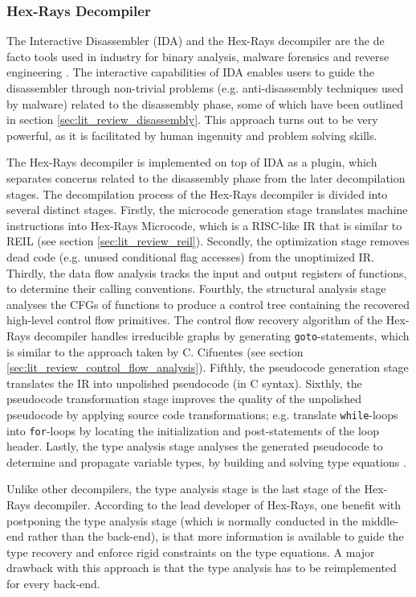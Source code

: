 
\subsubsection{Hex-Rays Decompiler}

The Interactive Disassembler (IDA) and the Hex-Rays decompiler are the de facto tools used in industry for binary analysis, malware forensics and reverse engineering \cite{semantics_preserving_structural_analysis}. The interactive capabilities of IDA enables users to guide the disassembler through non-trivial problems (e.g. anti-disassembly techniques used by malware) related to the disassembly phase, some of which have been outlined in section \ref{sec:lit_review_disassembly}. This approach turns out to be very powerful, as it is facilitated by human ingenuity and problem solving skills.

The Hex-Rays decompiler is implemented on top of IDA as a plugin, which separates concerns related to the disassembly phase from the later decompilation stages. The decompilation process of the Hex-Rays decompiler is divided into several distinct stages. Firstly, the microcode generation stage translates machine instructions into Hex-Rays Microcode, which is a RISC-like IR that is similar to REIL (see section \ref{sec:lit_review_reil}). Secondly, the optimization stage removes dead code (e.g. unused conditional flag accesses) from the unoptimized IR. Thirdly, the data flow analysis tracks the input and output registers of functions, to determine their calling conventions. Fourthly, the structural analysis stage analyses the CFGs of functions to produce a control tree containing the recovered high-level control flow primitives. The control flow recovery algorithm of the Hex-Rays decompiler handles irreducible graphs by generating \texttt{goto}-statements, which is similar to the approach taken by C. Cifuentes (see section \ref{sec:lit_review_control_flow_analysis}). Fifthly, the pseudocode generation stage translates the IR into unpolished pseudocode (in C syntax).  Sixthly, the pseudocode transformation stage improves the quality of the unpolished pseudocode by applying source code transformations; e.g. translate \texttt{while}-loops into \texttt{for}-loops by locating the initialization and post-statements of the loop header. Lastly, the type analysis stage analyses the generated pseudocode to determine and propagate variable types, by building and solving type equations \cite{hexrays}.

Unlike other decompilers, the type analysis stage is the last stage of the Hex-Rays decompiler. According to the lead developer of Hex-Rays, one benefit with postponing the type analysis stage (which is normally conducted in the middle-end rather than the back-end), is that more information is available to guide the type recovery and enforce rigid constraints on the type equations. A major drawback with this approach is that the type analysis has to be reimplemented for every back-end.
